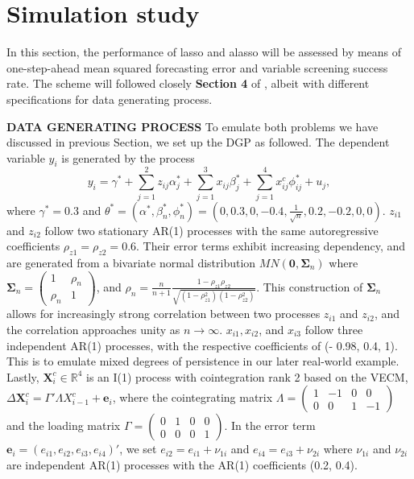 \documentclass[12pt,a4paper]{article}
\begin{document}
\section{Simulation study}
In this section, the performance of lasso and alasso will be assessed by means of one-step-ahead mean squared forecasting error and variable screening success rate. The scheme will followed closely \textbf{Section 4} of \cite{lee2018lasso}, albeit with different specifications for data generating process.

\textbf{DATA GENERATING PROCESS} To emulate both problems we have discussed in previous Section, we set up the DGP as followed. The dependent variable $ y_i $ is generated by the process
	\[ y_i = \gamma^* + \sum^2_{j = 1}z_{ij}\alpha_j^* + 
	\sum^3_{j = 1}x_{ij}\beta^*_j +
	\sum^4_{j = 1}x^c_{ij}\phi^*_{ij} +
	u_j, \]
where $ \gamma^* = 0.3 $ and $ \theta^* = (\alpha^*, \beta^*_n, \phi^*_n) = (0, 0.3, 0, - 0.4, \frac{1}{\sqrt{n}}, 0.2, - 0.2, 0, 0) $. $ z_{i1} $ and $ z_{i2} $ follow two stationary AR(1) processes with the same autoregressive coefficients $ \rho_{z1} = \rho_{z2} = 0.6 $. Their error terms exhibit increasing dependency, and are generated from a bivariate normal distribution $ MN(\bm{0}, \bm{\Sigma}_n) $ where $ \bm{\Sigma}_n =
 		\begin{pmatrix}
 			1 		& \rho_n \\
 			\rho_n 	& 1
 		\end{pmatrix}$, and $ \rho_n = \frac{n}{n + 1} \frac{1 - \rho_{z1}\rho_{z2}}{\sqrt{(1 - \rho_{z1} ^ 2)(1 - \rho_{z2} ^ 2)}} $. This construction of $ \bm{\Sigma}_n $ allows for increasingly strong correlation between two processes $ z_{i1} $ and $ z_{i2} $, and the correlation approaches unity as $ n \rightarrow \infty $. $ x_{i1}, x_{i2} $, and $ x_{i3} $ follow three independent AR(1) processes, with the respective coefficients of (- 0.98, 0.4, 1). This is to emulate mixed degrees of persistence in our later real-world example. Lastly, $ \bm{X}^c_i \in \mathbb{R}^4 $ is an I(1) process with cointegration rank 2 based on the VECM, $ \Delta \bm{X}^c_i = \Gamma'\Lambda X^c_{i - 1} + \bm{e}_i $, where the cointegrating matrix $ \Lambda = \begin{pmatrix}
 			1 & - 1 & 0 & 0 \\
 			0 & 0 & 1 & -1
 		\end{pmatrix} $ and the loading matrix $ \Gamma = 
 		\begin{pmatrix}
 			0 & 1 & 0 & 0 \\
 			0 & 0 & 0 & 1
 		\end{pmatrix} $. In the error term $ \bm{e}_i = (e_{i1}, e_{i2}, e_{i3}, e_{i4})' $, we set $ e_{i2} = e_{i1} + \nu_{1i} $ and $ e_{i4} = e_{i3} + \nu_{2i} $ where $ \nu_{1i} $ and $ \nu_{2i} $ are independent AR(1) processes with the AR(1) coefficients (0.2, 0.4).
 
\end{document}
